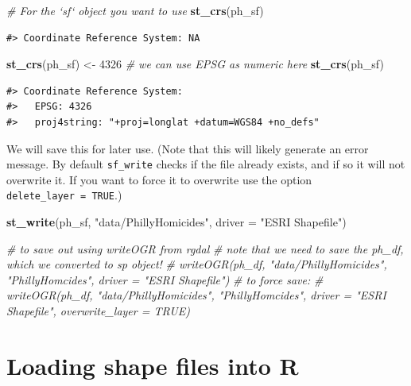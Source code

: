 \documentclass[]{book}
\newenvironment{Shaded}{\begin{snugshade}}{\end{snugshade}}
\newcommand{\KeywordTok}[1]{\textcolor[rgb]{0.13,0.29,0.53}{\textbf{#1}}}
\newcommand{\DataTypeTok}[1]{\textcolor[rgb]{0.13,0.29,0.53}{#1}}
\newcommand{\DecValTok}[1]{\textcolor[rgb]{0.00,0.00,0.81}{#1}}
\newcommand{\StringTok}[1]{\textcolor[rgb]{0.31,0.60,0.02}{#1}}
\newcommand{\CommentTok}[1]{\textcolor[rgb]{0.56,0.35,0.01}{\textit{#1}}}
\newcommand{\NormalTok}[1]{#1}
\theoremstyle{definition}
\theoremstyle{definition}
\theoremstyle{definition}
\theoremstyle{remark}
\begin{document}
\begin{Shaded}
\begin{Highlighting}[]
\CommentTok{# For the `sf` object you want to use }
\KeywordTok{st_crs}\NormalTok{(ph_sf)}
\end{Highlighting}
\end{Shaded}

\begin{verbatim}
#> Coordinate Reference System: NA
\end{verbatim}

\begin{Shaded}
\begin{Highlighting}[]
\KeywordTok{st_crs}\NormalTok{(ph_sf) <-}\StringTok{ }\DecValTok{4326} \CommentTok{# we can use EPSG as numeric here}
\KeywordTok{st_crs}\NormalTok{(ph_sf)}
\end{Highlighting}
\end{Shaded}

\begin{verbatim}
#> Coordinate Reference System:
#>   EPSG: 4326 
#>   proj4string: "+proj=longlat +datum=WGS84 +no_defs"
\end{verbatim}

We will save this for later use. (Note that this will likely generate an
error message. By default \texttt{sf\_write} checks if the file already
exists, and if so it will not overwrite it. If you want to force it to
overwrite use the option \texttt{delete\_layer\ =\ TRUE}.)

\begin{Shaded}
\begin{Highlighting}[]
\KeywordTok{st_write}\NormalTok{(ph_sf, }\StringTok{"data/PhillyHomicides"}\NormalTok{, }\DataTypeTok{driver =} \StringTok{"ESRI Shapefile"}\NormalTok{)}

\CommentTok{# to save out using writeOGR from rgdal}
\CommentTok{# note that we need to save the ph_df, which we converted to sp object!}
\CommentTok{# writeOGR(ph_df, "data/PhillyHomicides", "PhillyHomcides", driver = "ESRI Shapefile")}
\CommentTok{# to force save:}
\CommentTok{# writeOGR(ph_df, "data/PhillyHomicides", "PhillyHomcides", driver = "ESRI Shapefile", overwrite_layer = TRUE)}
\end{Highlighting}
\end{Shaded}

\section{Loading shape files into R}\label{loading-shape-files-into-r}
\end{document}
